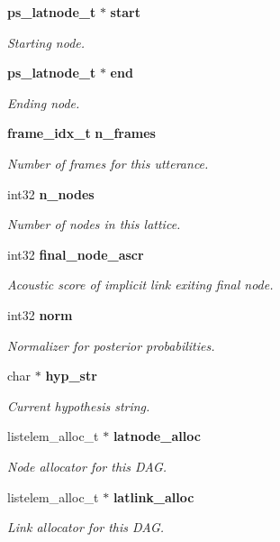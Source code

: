 \begin{DoxyCompactItemize}
{\bf ps\+\_\+latnode\+\_\+t} $\ast$ {\bf start}
\begin{DoxyCompactList}\small\item\em Starting node. \end{DoxyCompactList}\item 
{\bf ps\+\_\+latnode\+\_\+t} $\ast$ {\bf end}
\begin{DoxyCompactList}\small\item\em Ending node. \end{DoxyCompactList}\item 
{\bf frame\+\_\+idx\+\_\+t} {\bf n\+\_\+frames}
\begin{DoxyCompactList}\small\item\em Number of frames for this utterance. \end{DoxyCompactList}\item 
int32 {\bf n\+\_\+nodes}
\begin{DoxyCompactList}\small\item\em Number of nodes in this lattice. \end{DoxyCompactList}\item 
int32 {\bf final\+\_\+node\+\_\+ascr}
\begin{DoxyCompactList}\small\item\em Acoustic score of implicit link exiting final node. \end{DoxyCompactList}\item 
int32 {\bf norm}
\begin{DoxyCompactList}\small\item\em Normalizer for posterior probabilities. \end{DoxyCompactList}\item 
char $\ast$ {\bf hyp\+\_\+str}
\begin{DoxyCompactList}\small\item\em Current hypothesis string. \end{DoxyCompactList}\item 
listelem\+\_\+alloc\+\_\+t $\ast$ {\bf latnode\+\_\+alloc}
\begin{DoxyCompactList}\small\item\em Node allocator for this D\+A\+G. \end{DoxyCompactList}\item 
listelem\+\_\+alloc\+\_\+t $\ast$ {\bf latlink\+\_\+alloc}
\begin{DoxyCompactList}\small\item\em Link allocator for this D\+A\+G. \end{DoxyCompactList}\item 

\end{DoxyCompactItemize}
